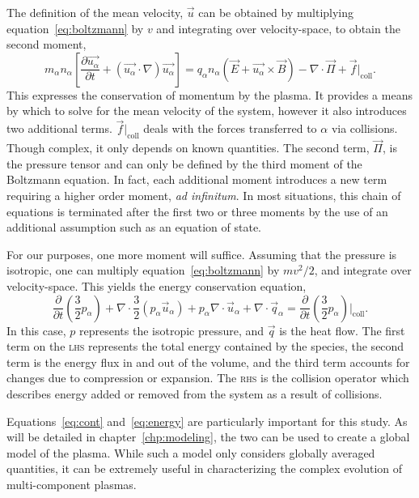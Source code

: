 The definition of the mean velocity, $\vec{u}$ can be obtained by multiplying
equation~\ref{eq:boltzmann} by $v$ and integrating over velocity-space, to
obtain the second moment,
\begin{equation}
  m_\alpha n_\alpha \left[ \frac{\partial \vec{u_\alpha}}{\partial t}
  + (\vec{u_\alpha} \cdot \nabla) \vec{u_\alpha}\right]
  = q_\alpha n_\alpha (\vec{E} + \vec{u_\alpha} \times \vec{B})
  - \nabla \cdot \vec{\Pi} + \vec{f}|_\mathrm{coll}.
  \label{eq:momentum}
\end{equation}
This expresses the conservation of momentum by the plasma. It provides a means
by which to solve for the mean velocity of the system, however it also
introduces two additional terms. $\vec{f}|_\mathrm{coll}$ deals with the forces
transferred to $\alpha$ via collisions. Though complex, it only depends on known
quantities. The second term, $\vec{\Pi}$, is the pressure tensor and can only be
defined by the third moment of the Boltzmann equation. In fact, each additional
moment introduces a new term requiring a higher order moment, \emph{ad
infinitum}. In most situations, this chain of equations is terminated after the
first two or three moments by the use of an additional assumption such as an
equation of state.

For our purposes, one more moment will suffice. Assuming that the pressure is
isotropic, one can multiply equation~\ref{eq:boltzmann} by $mv^2/2$, and
integrate over velocity-space. This yields the energy conservation equation,
\begin{equation}
  \frac{\partial}{\partial t}\left(\frac{3}{2}p_\alpha\right) 
  + \nabla\cdot\frac{3}{2} (p_\alpha\vec{u}_\alpha)
  + p_\alpha\nabla\cdot\vec{u}_\alpha
  + \nabla\cdot\vec{q}_\alpha
  = \frac{\partial}{\partial
  t}\left(\frac{3}{2}p_\alpha\right)\bigg|_\mathrm{coll}.
  \label{eq:energy}
\end{equation}
In this case, $p$ represents the isotropic pressure, and $\vec{q}$ is the heat
flow. The first term on the \textsc{lhs} represents the total energy contained
by the species, the second term is the energy flux in and out of the volume, and
the third term accounts for changes due to compression or expansion. The
\textsc{rhs} is the collision operator which describes energy added or removed
from the system as a result of collisions.

Equations~\ref{eq:cont} and~\ref{eq:energy} are particularly important for this
study. As will be detailed in chapter~\ref{chp:modeling}, the two can be used to
create a global model of the plasma. While such a model only considers globally
averaged quantities, it can be extremely useful in characterizing the complex
evolution of multi-component plasmas.

